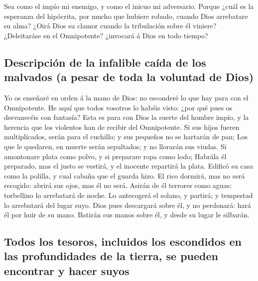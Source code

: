 Sea como el impío mi enemigo, y como el inicuo mi
adversario.  Porque ¿cuál es la esperanza del hipócrita,
por mucho que hubiere robado, cuando Dios arrebatare su alma?
 ¿Oirá Dios su clamor cuando la tribulación sobre él
viniere?  ¿Deleitaráse en el Omnipotente? ¿invocará á
Dios en todo tiempo?

\hypertarget{descripciuxf3n-de-la-infalible-cauxedda-de-los-malvados-a-pesar-de-toda-la-voluntad-de-dios}{%
\subsection{Descripción de la infalible caída de los malvados (a pesar
de toda la voluntad de
Dios)}\label{descripciuxf3n-de-la-infalible-cauxedda-de-los-malvados-a-pesar-de-toda-la-voluntad-de-dios}}

 Yo os enseñaré en orden á la mano de Dios: no esconderé
lo que hay para con el Omnipotente.  He aquí que todos
vosotros lo habéis visto: ¿por qué pues os desvanecéis con fantasía?
 Esta es para con Dios la suerte del hombre impío, y la
herencia que los violentos han de recibir del Omnipotente.
 Si sus hijos fueren multiplicados, serán para el
cuchillo; y sus pequeños no se hartarán de pan;  Los que
le quedaren, en muerte serán sepultados; y no llorarán sus viudas.
 Si amontonare plata como polvo, y si preparare ropa como
lodo;  Habrála él preparado, mas el justo se vestirá, y
el inocente repartirá la plata.  Edificó su casa como la
polilla, y cual cabaña que el guarda hizo.  El rico
dormirá, mas no será recogido: abrirá sus ojos, mas él no será.
 Asirán de él terrores como aguas: torbellino lo
arrebatará de noche.  Lo antecogerá el solano, y partirá;
y tempestad lo arrebatará del lugar suyo.  Dios pues
descargará sobre él, y no perdonará: hará él por huir de su mano.
 Batirán sus manos sobre él, y desde su lugar le
silbarán.

\hypertarget{todos-los-tesoros-incluidos-los-escondidos-en-las-profundidades-de-la-tierra-se-pueden-encontrar-y-hacer-suyos}{%
\subsection{Todos los tesoros, incluidos los escondidos en las
profundidades de la tierra, se pueden encontrar y hacer
suyos}\label{todos-los-tesoros-incluidos-los-escondidos-en-las-profundidades-de-la-tierra-se-pueden-encontrar-y-hacer-suyos}}

